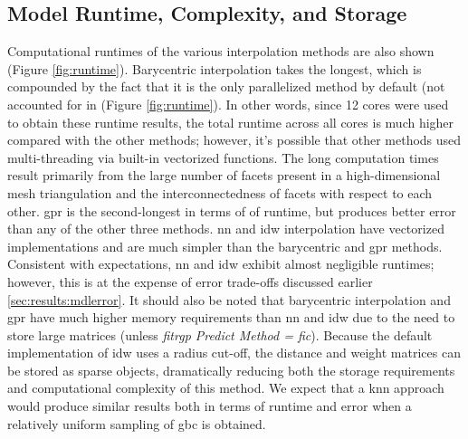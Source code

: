 \documentclass[preprint,12pt]{elsarticle}
\begin{document}
\subsection{Model Runtime, Complexity, and Storage}
Computational runtimes of the various interpolation methods are also shown (Figure \ref{fig:runtime}). Barycentric interpolation takes the longest, which is compounded by the fact that it is the only parallelized method by default (not accounted for in (Figure \ref{fig:runtime}). In other words, since 12 cores were used to obtain these runtime results, the total runtime across all cores is much higher compared with the other methods; however, it's possible that other methods used multi-threading via built-in vectorized functions. The long computation times result primarily from the large number of facets present in a high-dimensional mesh triangulation and the interconnectedness of facets with respect to each other. \Gls{gpr} is the second-longest in terms of of runtime, but produces better error than any of the other three methods. \Gls{nn} and \gls{idw} interpolation have vectorized implementations and are much simpler than the barycentric and \gls{gpr} methods. Consistent with expectations, \gls{nn} and \gls{idw} exhibit almost negligible runtimes; however, this is at the expense of error trade-offs discussed earlier \ref{sec:results:mdlerror}. It should also be noted that barycentric interpolation and \gls{gpr} have much higher memory requirements than \gls{nn} and \gls{idw} due to the need to store large matrices (unless \textit{fitrgp Predict Method = \gls{fic}}). Because the default implementation of \gls{idw} uses a radius cut-off, the distance and weight matrices can be stored as sparse objects, dramatically reducing both the storage requirements and computational complexity of this method. We expect that a \gls{knn} approach would produce similar results both in terms of runtime and error when a relatively uniform sampling of \gls{gbc} is obtained.
\end{document}
